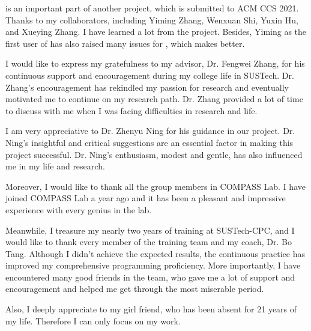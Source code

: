 \TheName is an important part of another project, which is submitted to ACM CCS 2021. Thanks to my collaborators, including Yiming Zhang, Wenxuan Shi, Yuxin Hu, and Xueying Zhang. I have learned a lot from the project. Besides, Yiming as the first user of \TheName has also raised many issues for \TheName, which makes \TheName better.

I would like to express my gratefulness to my advisor, Dr. Fengwei Zhang, for his continuous support and encouragement during my college life in SUSTech.  Dr. Zhang's encouragement has rekindled my passion for research and eventually motivated me to continue on my research path. Dr. Zhang provided a lot of time to discuss with me when I was facing difficulties in research and life.

I am very appreciative to Dr. Zhenyu Ning for his guidance in our project. Dr. Ning's insightful and critical suggestions are an essential factor in making this project successful. Dr. Ning's enthusiasm, modest and gentle, has also influenced me in my life and research.

Moreover, I would like to thank all the group members in COMPASS Lab. I have joined COMPASS Lab a year ago and it has been a pleasant and impressive experience with every genius in the lab. 

Meanwhile, I treasure my nearly two years of training at SUSTech-CPC, and I would like to thank every member of the training team and my coach, Dr. Bo Tang. Although I didn't achieve the expected results, the continuous practice has improved my comprehensive programming proficiency. More importantly, I have encountered many good friends in the team, who gave me a lot of support and encouragement and helped me get through the most miserable period.



Also, I deeply appreciate to my girl friend, who has been absent for 21 years of my life. Therefore I can only focus on my work. 